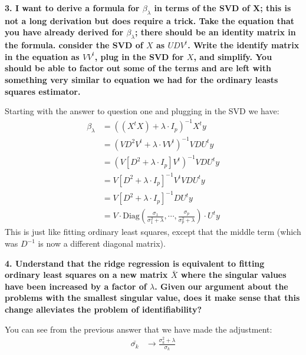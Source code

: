 \documentclass[12pt,hidelinks]{article}
\numberwithin{equation}{section}
\begin{document}
\vspace*{12pt}

\textbf{3. I want to derive a formula for $\beta_{\lambda}$ in terms of the SVD of X;
this is not a long derivation but does require a trick. Take the equation that you
have already derived for $\beta_{\lambda}$; there should be an identity matrix in
the formula. consider the SVD of $X$ as $UDV^t$. Write the identify matrix in the
equation as $VV^t$, plug in the SVD for $X$, and simplify. You should be able to
factor out some of the terms and are left with something very similar to equation
we had for the ordinary leasts squares estimator.}

\vspace*{12pt}

Starting with the answer to question one and plugging in the SVD we have:
\begin{align}
\beta_\lambda &= \left((X^t X) + \lambda \cdot I_p \right)^{-1} X^t y \\
&= \left( V D^2 V^t + \lambda \cdot VV^t \right)^{-1} V D U^t y \\
&= \left( V \left[D^2 + \lambda \cdot I_p \right] V^t \right)^{-1} V D U^t y \\
&= V \left[D^2 + \lambda \cdot I_p \right]^{-1} V^t V D U^t y \\
&= V \left[D^2 + \lambda \cdot I_p \right]^{-1} D U^t y \\
&= V \cdot \text{Diag} \left( \frac{\sigma_1}{\sigma_1^2 + \lambda}, \cdots, \frac{\sigma_p}{\sigma_p^2 + \lambda} \right) \cdot U^t y
\end{align}
This is just like fitting ordinary least squares, except that the middle term (which
was $D^{-1}$ is now a different diagonal matrix).

\vspace*{12pt}

\textbf{4. Understand that the ridge regression is equivalent to fitting ordinary
least squares on a new matrix $\bar{X}$ where the singular values have been
increased by a factor of $\lambda$. Given our argument about the problems with
the smallest singular value, does it make sense that this change alleviates the
problem of identifiability?}

\vspace*{12pt}

You can see from the previous answer that we have made the adjustment:
\begin{align}
\bar{\sigma_k} &\rightarrow \frac{\sigma_k^2 + \lambda}{\sigma_k}
\end{align}
\end{document}
